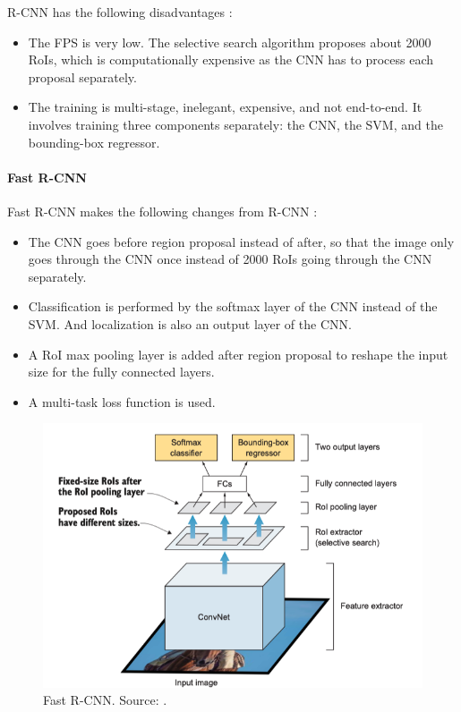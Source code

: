 \documentclass[a4paper, 11pt, oneside]{article}
\begin{document}
  R-CNN has the following disadvantages \cite{elgendy2020deep, girshick2014rich, girshick2015fast}:

  \begin{itemize}
    \item The FPS is very low. The selective search algorithm proposes about 2000 RoIs, which is computationally
    expensive as the CNN has to process each proposal separately.
    \item The training is multi-stage, inelegant, expensive, and not end-to-end. It involves training three components
    separately: the CNN, the SVM, and the bounding-box regressor.
  \end{itemize}

  \paragraph{Fast R-CNN}

  Fast R-CNN makes the following changes from R-CNN \cite{elgendy2020deep, girshick2015fast}:

  \begin{itemize}
    \item The CNN goes before region proposal instead of after, so that the image only goes through the CNN once instead
    of 2000 RoIs going through the CNN separately.
    \item Classification is performed by the softmax layer of the CNN instead of the SVM. And localization is also an output
    layer of the CNN.
    \item A RoI max pooling layer is added after region proposal to reshape the input size for the fully connected layers.
    \item A multi-task loss function is used.
  \end{itemize}

  \begin{figure}[ht]
    \begin{center}
      \includegraphics[width=.8\textwidth]{fast_r_cnn.png}
    \end{center}
    \caption{Fast R-CNN. Source: \cite{elgendy2020deep}.}
  \end{figure}
\end{document}
